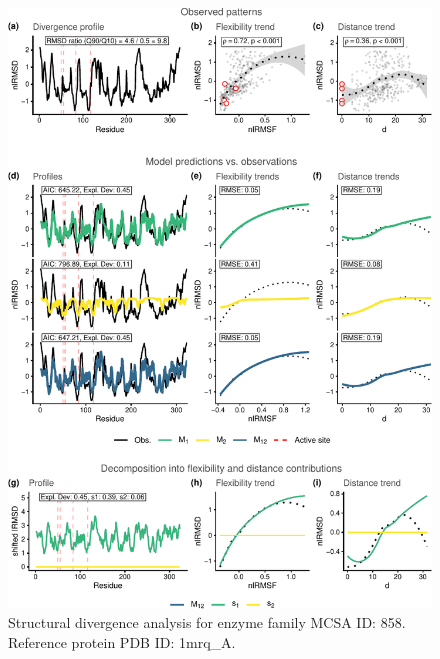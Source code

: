 \documentclass[
]{article}
\begin{document}
\clearpage
\begin{figure}[H]
\centering


\begin{center}\includegraphics{supplementary_material_files/figure-latex/generate_figures-30} \end{center}

\caption{Structural divergence analysis for enzyme family MCSA ID: 858. Reference protein PDB ID: 1mrq\_A.}
\end{figure}
\end{document}
